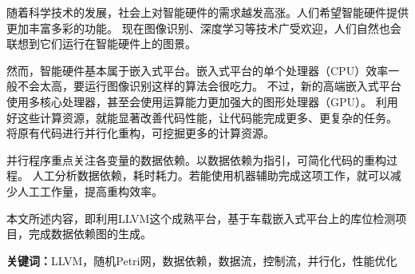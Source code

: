 
\begin{center}
    \LARGE{\vspace*{1em}}
    \LARGE{\vspace{1em}}

\end{center}

随着科学技术的发展，社会上对智能硬件的需求越发高涨。人们希望智能硬件提供更加丰富多彩的功能。
现在图像识别、深度学习等技术广受欢迎，人们自然也会联想到它们运行在智能硬件上的图景。

然而，智能硬件基本属于嵌入式平台。嵌入式平台的单个处理器（CPU）效率一般不会太高，要运行图像识别这样的算法会很吃力。
不过，新的高端嵌入式平台使用多核心处理器，甚至会使用运算能力更加强大的图形处理器（GPU）。
利用好这些计算资源，就能显著改善代码性能，让代码能完成更多、更复杂的任务。
将原有代码进行并行化重构，可挖掘更多的计算资源。

并行程序重点关注各变量的数据依赖。以数据依赖为指引，可简化代码的重构过程。
人工分析数据依赖，耗时耗力。若能使用机器辅助完成这项工作，就可以减少人工工作量，提高重构效率。

本文所述内容，即利用LLVM这个成熟平台，基于车载嵌入式平台上的库位检测项目，完成数据依赖图的生成。

\vspace{1em}

\textbf{关键词：}\textnormal{LLVM，随机Petri网，数据依赖，数据流，控制流，并行化，性能优化}
